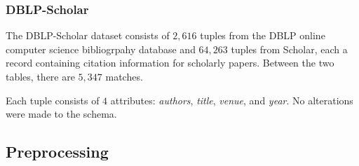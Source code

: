 \documentclass{proc}
\begin{document}
\subsubsection{DBLP-Scholar}

The DBLP-Scholar dataset consists of $2,616$ tuples from the DBLP online computer science bibliogrpahy database and $64,263$ tuples from Scholar, each a record containing citation information for scholarly papers.  Between the two tables, there are $5,347$ matches.

Each tuple consists of $4$ attributes: \textit{authors}, \textit{title}, \textit{venue}, and \textit{year}. No alterations were made to the schema.

\subsection{Preprocessing}
\end{document}
